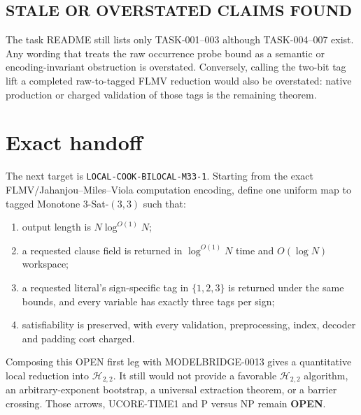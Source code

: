 \documentclass[11pt]{article}
\newcommand{\Htwo}{\mathcal H_{2,2}}
\newcommand{\OPEN}{\textbf{OPEN}}
\begin{document}
\subsection*{STALE OR OVERSTATED CLAIMS FOUND}
The task README still lists only TASK-001--003 although TASK-004--007 exist.
Any wording that treats the raw occurrence probe bound as a semantic or
encoding-invariant obstruction is overstated.  Conversely, calling the
two-bit tag lift a completed raw-to-tagged FLMV reduction would also be
overstated: native production or charged validation of those tags is the
remaining theorem.

\section{Exact handoff}

The next target is \texttt{LOCAL-COOK-BILOCAL-M33-1}.  Starting from the
exact FLMV/Jahanjou--Miles--Viola computation encoding, define one uniform
map to tagged Monotone 3-Sat-$(3,3)$ such that:
\begin{enumerate}[nosep]
\item output length is $N\log^{O(1)}N$;
\item a requested clause field is returned in $\log^{O(1)}N$ time and
$O(\log N)$ workspace;
\item a requested literal's sign-specific tag in $\{1,2,3\}$ is returned
under the same bounds, and every variable has exactly three tags per sign;
\item satisfiability is preserved, with every validation, preprocessing,
index, decoder and padding cost charged.
\end{enumerate}
Composing this OPEN first leg with MODELBRIDGE-0013 gives a quantitative
local reduction into $\Htwo$.  It still would not provide a favorable
$\Htwo$ algorithm, an arbitrary-exponent bootstrap, a universal extraction
theorem, or a barrier crossing.  Those arrows, UCORE-TIME1 and P versus NP
remain \OPEN.
\end{document}
